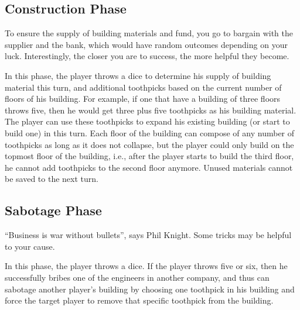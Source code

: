 \documentclass[a4paper, twocolumn, 12pt, twoside, english]{article}
\begin{document}
\subsection{Construction Phase}
\begin{tcolorbox}
To ensure the supply of building materials and fund, you go to bargain with the supplier and the bank, which would have random outcomes depending on your luck. Interestingly, the closer you are to success, the more helpful they become.
\end{tcolorbox}
In this phase, the player throws a dice to determine his supply of building material this turn, and additional toothpicks based on the current number of floors of his building. For example, if one that have a building of three floors throws five, then he would get three plus five toothpicks as his building material. The player can use these toothpicks to expand his existing building (or start to build one) in this turn. Each floor of the building can compose of any number of toothpicks as long as it does not collapse, but the player could only build on the topmost floor of the building, i.e., after the player starts to build the third floor, he cannot add toothpicks to the second floor anymore. Unused materials cannot be saved to the next turn.
%
\subsection{Sabotage Phase}
\begin{tcolorbox}
``Business is war without bullets'', says Phil Knight. Some tricks may be helpful to your cause.
\end{tcolorbox}
In this phase, the player throws a dice. If the player throws five or six, then he successfully bribes one of the engineers in another company, and thus can sabotage another player's building by choosing one toothpick in his building and force the target player to remove that specific toothpick from the building.
\end{document}
